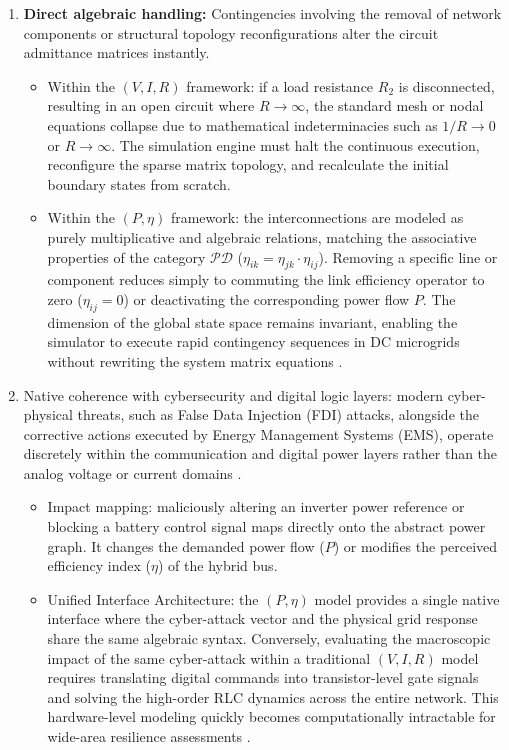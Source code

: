 \documentclass[energies,accept,oneauthor,pdftex]{Definitions/mdpi}
\begin{document}
\begin{enumerate}
    \item \textbf{Direct algebraic handling:}
    Contingencies involving the removal of network components or structural topology reconfigurations alter the circuit admittance matrices instantly.
    \begin{itemize}
        \item Within the $(V, I, R)$ framework: if a load resistance $R_2$ is disconnected, resulting in an open circuit where $R \to \infty$, the standard mesh or nodal equations collapse due to mathematical indeterminacies such as $1/R \to 0$ or $R \to \infty$. The simulation engine must halt the continuous execution, reconfigure the sparse matrix topology, and recalculate the initial boundary states from scratch.
        \item Within the $(P, \eta)$ framework: the interconnections are modeled as purely multiplicative and algebraic relations, matching the associative properties of the category $\mathcal{PD}$ ($\eta_{ik} = \eta_{jk} \cdot \eta_{ij}$). Removing a specific line or component reduces simply to commuting the link efficiency operator to zero ($\eta_{ij} = 0$) or deactivating the corresponding power flow $P$. The dimension of the global state space remains invariant, enabling the simulator to execute rapid contingency sequences in DC microgrids without rewriting the system matrix equations \cite{gonzalezdedurana2025novel}.
    \end{itemize}

    \item Native coherence with cybersecurity and digital logic layers:
    modern cyber-physical threats, such as False Data Injection (FDI) attacks, alongside the corrective actions executed by Energy Management Systems (EMS), operate discretely within the communication and digital power layers rather than the analog voltage or current domains \cite{pr13092969, sys12040109}.
    \begin{itemize}
        \item Impact mapping: maliciously altering an inverter power reference or blocking a battery control signal maps directly onto the abstract power graph. It changes the demanded power flow ($P$) or modifies the perceived efficiency index ($\eta$) of the hybrid bus.
        \item Unified Interface Architecture: the $(P, \eta)$ model provides a single native interface where the cyber-attack vector and the physical grid response share the same algebraic syntax. Conversely, evaluating the macroscopic impact of the same cyber-attack within a traditional $(V, I, R)$ model requires translating digital commands into transistor-level gate signals and solving the high-order RLC dynamics across the entire network. This hardware-level modeling quickly becomes computationally intractable for wide-area resilience assessments \cite{moutevelis2024taxonomy, pr13092969, sys12040109, appl14221111}.
    \end{itemize}
\end{enumerate}
\end{document}
